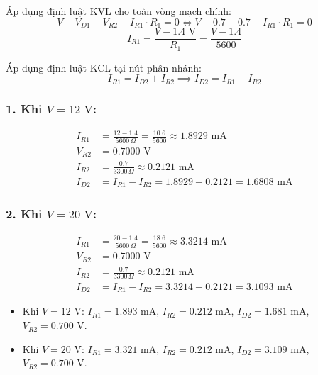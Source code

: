 \noindent Áp dụng định luật KVL cho toàn vòng mạch chính:
\begin{equation}
  V - V_{D1} - V_{R2} - I_{R1} \cdot R_1 = 0 \iff V - 0.7 - 0.7 - I_{R1} \cdot R_1 = 0
\end{equation}
\begin{equation}
  I_{R1} = \frac{V - 1.4\text{ V}}{R_1} = \frac{V - 1.4}{5600}
\end{equation}

\noindent Áp dụng định luật KCL tại nút phân nhánh:
\begin{equation}
  I_{R1} = I_{D2} + I_{R2} \implies I_{D2} = I_{R1} - I_{R2}
\end{equation}

\subsubsection*{1. Khi $V = 12\text{ V}$:}
\begin{align*}
  I_{R1} &= \frac{12 - 1.4}{5600\,\Omega} = \frac{10.6}{5600} \approx 1.8929\text{ mA} \\
  V_{R2} &= 0.7000\text{ V} \\
  I_{R2} &= \frac{0.7}{3300\,\Omega} \approx 0.2121\text{ mA} \\
  I_{D2} &= I_{R1} - I_{R2} = 1.8929 - 0.2121 = 1.6808\text{ mA}
\end{align*}

\subsubsection*{2. Khi $V = 20\text{ V}$:}
\begin{align*}
  I_{R1} &= \frac{20 - 1.4}{5600\,\Omega} = \frac{18.6}{5600} \approx 3.3214\text{ mA} \\
  V_{R2} &= 0.7000\text{ V} \\
  I_{R2} &= \frac{0.7}{3300\,\Omega} \approx 0.2121\text{ mA} \\
  I_{D2} &= I_{R1} - I_{R2} = 3.3214 - 0.2121 = 3.1093\text{ mA}
\end{align*}

\begin{dapsobox}
  \begin{itemize}[leftmargin=1.5em]
    \item Khi $V = 12\text{ V}$: $I_{R1} = 1.893\text{ mA}$, $I_{R2} = 0.212\text{ mA}$, $I_{D2} = 1.681\text{ mA}$, $V_{R2} = 0.700\text{ V}$.
    \item Khi $V = 20\text{ V}$: $I_{R1} = 3.321\text{ mA}$, $I_{R2} = 0.212\text{ mA}$, $I_{D2} = 3.109\text{ mA}$, $V_{R2} = 0.700\text{ V}$.
  \end{itemize}
\end{dapsobox}

